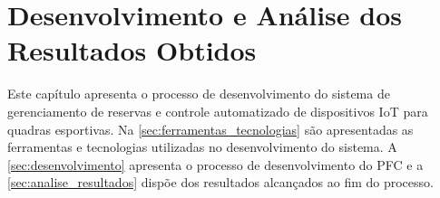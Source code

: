 \chapter{Desenvolvimento e Análise dos Resultados Obtidos}\label{cap:desenvolvimento_e_analise_resultados}
Este capítulo apresenta o processo de desenvolvimento do sistema de gerenciamento de reservas e controle automatizado de dispositivos IoT para quadras esportivas. Na \autoref{sec:ferramentas_tecnologias} são apresentadas as ferramentas e tecnologias utilizadas no desenvolvimento do sistema. A \autoref{sec:desenvolvimento} apresenta o processo de desenvolvimento do PFC e a \autoref{sec:analise_resultados} dispõe dos resultados alcançados ao fim do processo.




